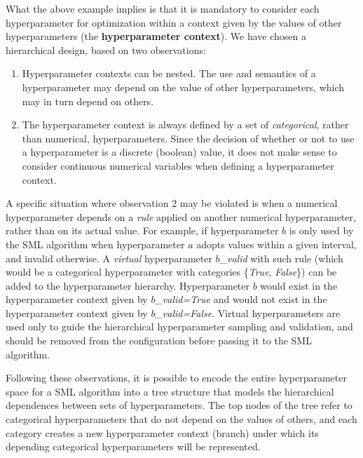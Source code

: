 	What the above example implies is that it is mandatory to consider each hyperparameter for
	optimization within a context given by the values of other hyperparameters (the {\bf
	hyperparameter context}). We have chosen a hierarchical design, based on two observations:
	\begin{enumerate}
		\item
		Hyperparameter contexts can be nested. The use and semantics of a hyperparameter may depend
		on the value of other hyperparameters, which may in turn depend on others.
		\item
		The hyperparameter context is always defined by a set of \emph{categorical}, rather than
		numerical, hyperparameters. Since the decision of whether or not to use a hyperparameter is
		a discrete (boolean) value, it does not make sense to consider continuous numerical
		variables when defining a hyperparameter context.
		
	\end{enumerate}

	A specific situation where observation 2 may be violated is when a numerical hyperparameter depends
	on a \emph{rule} applied on another numerical hyperparameter, rather than on its actual value. For
	example, if hyperparameter $b$ is only used by the SML algorithm when hyperparameter $a$ adopts
	values within a given interval, and invalid otherwise. A \emph{virtual} hyperparameter
	\emph{$b$\_valid} with such rule (which would be a categorical hyperparameter with categories
	\{\emph{True}, \emph{False}\}) can be added to the hyperparameter hierarchy. Hyperparameter
	$b$ would exist in the hyperparameter context given by \emph{$b$\_valid=True} and would not
	exist in the hyperparameter context given by \emph{$b$\_valid=False}. Virtual hyperparameters
	are used only to guide the hierarchical hyperparameter sampling and validation, and should be
	removed from the configuration before passing it to the SML algorithm.

	Following these observations, it is possible to encode the entire hyperparameter space for a SML
	algorithm into a tree structure that models the hierarchical dependences between sets of
	hyperparameters. The top nodes of the tree refer to categorical hyperparameters that do not
	depend on the values of others, and each category creates a new hyperparameter context (branch)
	under which its depending categorical hyperparameters will be represented.
	
